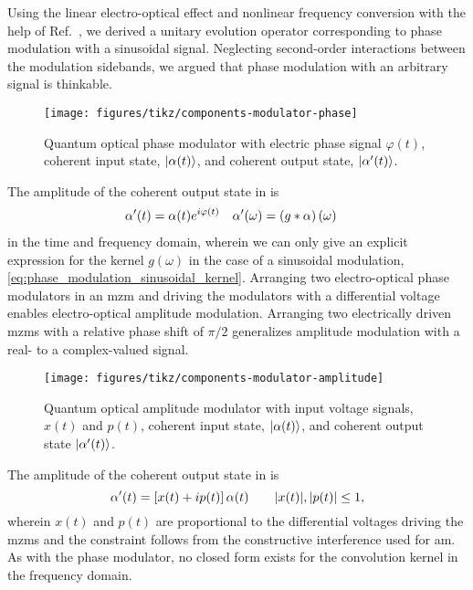Using the linear electro-optical effect and nonlinear frequency conversion with the help of Ref.~\cite{Horoshko2018,QuesadaMejia2015}, we derived a unitary evolution operator corresponding to phase modulation with a sinusoidal signal.
Neglecting second-order interactions between the modulation sidebands, we argued that phase modulation with an arbitrary signal is thinkable.
\begin{figure}[htb]
    \centering
    \texttt{[image: figures/tikz/components-modulator-phase]}
    \caption{Quantum optical phase modulator with electric phase signal $\varphi(t)$, coherent input state, $\lvert\alpha(t)\rangle$, and coherent output state, $\lvert\alpha^\prime(t)\rangle$.}\label{fig:components_modulator_phase}
\end{figure}
The amplitude of the coherent output state in  is
\begin{align}
	\alpha^\prime(t)
	&=
	\alpha(t)
	e^{i\varphi(t)}
	&
	\alpha^\prime(\omega)
	&=
	\left(g\ast\alpha\right)(\omega)
\end{align}
in the time and frequency domain, wherein we can only give an explicit expression for the kernel $g(\omega)$ in the case of a sinusoidal modulation, \cref{eq:phase_modulation_sinusoidal_kernel}.
Arranging two electro-optical phase modulators in an \gls{mzm} and driving the modulators with a differential voltage enables electro-optical amplitude modulation.
Arranging two electrically driven \gls{mzm}s with a relative phase shift of $\pi/2$ generalizes amplitude modulation with a real- to a complex-valued signal.
\begin{figure}[htb]
    \centering
    \texttt{[image: figures/tikz/components-modulator-amplitude]}
    \caption{Quantum optical amplitude modulator with input voltage signals, $x(t)$ and $p(t)$, coherent input state, $\lvert\alpha(t)\rangle$, and coherent output state $\lvert\alpha^\prime(t)\rangle$.}\label{fig:components_modulator_phase}
\end{figure}
The amplitude of the coherent output state in  is
\begin{equation}
	\alpha^\prime(t)
	=
	\left[
		x(t)
		+
		ip(t)
	\right]
	\alpha(t)
	\qquad
	\lvert x(t)\rvert,
	\lvert p(t)\rvert
	\leq
	1
	,
\end{equation}
wherein $x(t)$ and $p(t)$ are proportional to the differential voltages driving the \gls{mzm}s and the constraint follows from the constructive interference used for \gls{am}.
As with the phase modulator, no closed form exists for the convolution kernel in the frequency domain.

